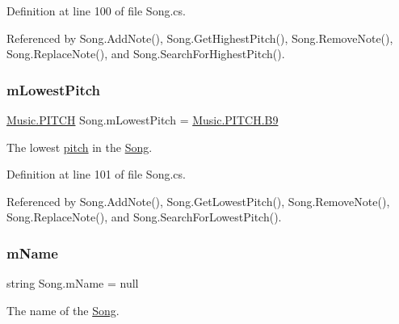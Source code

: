 Definition at line 100 of file Song.\+cs.



Referenced by Song.\+Add\+Note(), Song.\+Get\+Highest\+Pitch(), Song.\+Remove\+Note(), Song.\+Replace\+Note(), and Song.\+Search\+For\+Highest\+Pitch().

\mbox{\label{group___song_priv_var_ga293976ef4c2050687a81edfbf77b4fc1}} 
\subsubsection{\texorpdfstring{m\+Lowest\+Pitch}{mLowestPitch}}
{\footnotesize\ttfamily \hyperlink{group___music_enums_ga508f69b199ea518f935486c990edac1d}{Music.\+P\+I\+T\+CH} Song.\+m\+Lowest\+Pitch = \hyperlink{group___music_enums_gga508f69b199ea518f935486c990edac1da18fc90be5b8124af983421d29bfc4352}{Music.\+P\+I\+T\+C\+H.\+B9}\hspace{0.3cm}{\ttfamily [private]}}



The lowest \hyperlink{group___music_enums_ga508f69b199ea518f935486c990edac1d}{pitch} in the \hyperlink{class_song}{Song}. 



Definition at line 101 of file Song.\+cs.



Referenced by Song.\+Add\+Note(), Song.\+Get\+Lowest\+Pitch(), Song.\+Remove\+Note(), Song.\+Replace\+Note(), and Song.\+Search\+For\+Lowest\+Pitch().

\mbox{\label{group___song_priv_var_ga6a5e6c1e4aa92939e2b5c1e3d9908df8}} 
\subsubsection{\texorpdfstring{m\+Name}{mName}}
{\footnotesize\ttfamily string Song.\+m\+Name = null\hspace{0.3cm}{\ttfamily [private]}}



The name of the \hyperlink{class_song}{Song}. 




